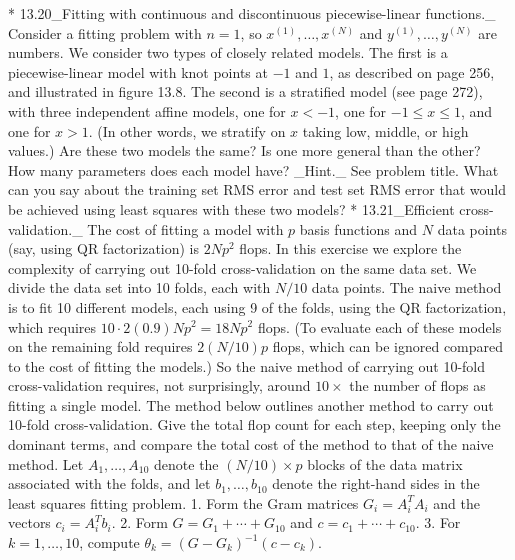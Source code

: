* 13.20_Fitting with continuous and discontinuous piecewise-linear functions._ Consider a fitting problem with \(n=1\), so \(x^{(1)},\ldots,x^{(N)}\) and \(y^{(1)},\ldots,y^{(N)}\) are numbers. We consider two types of closely related models. The first is a piecewise-linear model with knot points at \(-1\) and \(1\), as described on page 256, and illustrated in figure 13.8. The second is a stratified model (see page 272), with three independent affine models, one for \(x<-1\), one for \(-1\leq x\leq 1\), and one for \(x>1\). (In other words, we stratify on \(x\) taking low, middle, or high values.) Are these two models the same? Is one more general than the other? How many parameters does each model have? _Hint._ See problem title. What can you say about the training set RMS error and test set RMS error that would be achieved using least squares with these two models?
* 13.21_Efficient cross-validation._ The cost of fitting a model with \(p\) basis functions and \(N\) data points (say, using QR factorization) is \(2Np^{2}\) flops. In this exercise we explore the complexity of carrying out 10-fold cross-validation on the same data set. We divide the data set into 10 folds, each with \(N/10\) data points. The naive method is to fit 10 different models, each using 9 of the folds, using the QR factorization, which requires \(10\cdot 2(0.9)Np^{2}=18Np^{2}\) flops. (To evaluate each of these models on the remaining fold requires \(2(N/10)p\) flops, which can be ignored compared to the cost of fitting the models.) So the naive method of carrying out 10-fold cross-validation requires, not surprisingly, around \(10\times\) the number of flops as fitting a single model. The method below outlines another method to carry out 10-fold cross-validation. Give the total flop count for each step, keeping only the dominant terms, and compare the total cost of the method to that of the naive method. Let \(A_{1},\ldots,A_{10}\) denote the \((N/10)\times p\) blocks of the data matrix associated with the folds, and let \(b_{1},\ldots,b_{10}\) denote the right-hand sides in the least squares fitting problem. 1. Form the Gram matrices \(G_{i}=A_{i}^{T}A_{i}\) and the vectors \(c_{i}=A_{i}^{T}b_{i}\). 2. Form \(G=G_{1}+\cdots+G_{10}\) and \(c=c_{1}+\cdots+c_{10}\). 3. For \(k=1,\ldots,10\), compute \(\theta_{k}=(G-G_{k})^{-1}(c-c_{k})\).
